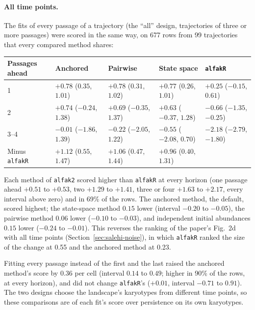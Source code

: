 \documentclass[11pt]{article}
\begin{document}
\paragraph{All time points.} The fits of every passage of a trajectory (the
``all'' design, trajectories of three or more passages) were scored in the same
way, on 677 rows from 99 trajectories that every compared method shares:

\begin{center}
\begin{tabular}{L{0.14\textwidth}L{0.16\textwidth}L{0.16\textwidth}L{0.16\textwidth}L{0.16\textwidth}}
\toprule
Passages ahead & Anchored & Pairwise & State space & \texttt{alfakR} \\
 & $+0.78$ ($0.35$, $1.01$) & $+0.78$ ($0.31$, $1.02$) & $+0.77$ ($0.26$, $1.01$) & $+0.25$ ($-0.15$, $0.61$) \\
2 & $+0.74$ ($-0.24$, $1.38$) & $+0.69$ ($-0.35$, $1.37$) & $+0.63$ ($-0.37$, $1.28$) & $-0.66$ ($-1.35$, $-0.25$) \\
3--4 & $-0.01$ ($-1.86$, $1.39$) & $-0.22$ ($-2.05$, $1.22$) & $-0.55$ ($-2.08$, $0.70$) & $-2.18$ ($-2.79$, $-1.80$) \\
\midrule
Minus \texttt{alfakR} & $+1.12$ ($0.55$, $1.47$) & $+1.06$ ($0.47$, $1.44$) & $+0.96$ ($0.40$, $1.31$) & \\
\bottomrule
\end{tabular}
\end{center}

Each method of \texttt{alfak2} scored higher than \texttt{alfakR} at every
horizon (one passage ahead $+0.51$ to $+0.53$, two $+1.29$ to $+1.41$, three
or four $+1.63$ to $+2.17$, every interval above zero) and in 69\% of the
rows. The anchored method, the default, scored highest; the state-space
method $0.15$ lower (interval $-0.20$ to $-0.05$), the pairwise method $0.06$
lower ($-0.10$ to $-0.03$), and independent initial abundances $0.15$ lower
($-0.24$ to $-0.01$). This reverses the ranking of the paper's Fig.~2d with
all time points (Section~\ref{sec:salehi-noise}), in which \texttt{alfakR}
ranked the size of the change at 0.55 and the anchored method at 0.23.

Fitting every passage instead of the first and the last raised the anchored
method's score by $0.36$ per cell (interval $0.14$ to $0.49$; higher in 90\%
of the rows, at every horizon), and did not change \texttt{alfakR}'s ($+0.01$,
interval $-0.71$ to $0.91$). The two designs choose the landscape's
karyotypes from different time points, so these comparisons are of each
fit's score over persistence on its own karyotypes.
\end{document}

